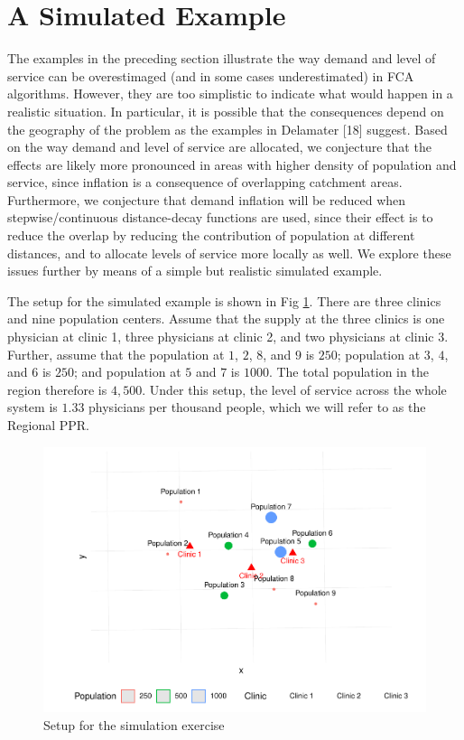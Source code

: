 \documentclass[10pt,letterpaper]{article}
\begin{document}
\section{A Simulated Example}\label{a-simulated-example}

The examples in the preceding section illustrate the way demand and
level of service can be overestimaged (and in some cases underestimated)
in FCA algorithms. However, they are too simplistic to indicate what
would happen in a realistic situation. In particular, it is possible
that the consequences depend on the geography of the problem as the
examples in Delamater {[}18{]} suggest. Based on the way demand and
level of service are allocated, we conjecture that the effects are
likely more pronounced in areas with higher density of population and
service, since inflation is a consequence of overlapping catchment
areas. Furthermore, we conjecture that demand inflation will be reduced
when stepwise/continuous distance-decay functions are used, since their
effect is to reduce the overlap by reducing the contribution of
population at different distances, and to allocate levels of service
more locally as well. We explore these issues further by means of a
simple but realistic simulated example.

The setup for the simulated example is shown in Fig
\ref{fig:fig6-simulation}. There are three clinics and nine population
centers. Assume that the supply at the three clinics is one physician at
clinic 1, three physicians at clinic 2, and two physicians at clinic 3.
Further, assume that the population at \(1\), \(2\), \(8\), and \(9\) is
\(250\); population at \(3\), \(4\), and \(6\) is \(250\); and
population at \(5\) and \(7\) is \(1000\). The total population in the
region therefore is \(4,500\). Under this setup, the level of service
across the whole system is \(1.33\) physicians per thousand people,
which we will refer to as the Regional PPR.

\begin{figure}
\includegraphics[width=0.95\linewidth]{Supply_and_Demand_Inflation_in_FCA_Methods_v2.1_files/figure-latex/fig6-simulation-1} \caption{\label{fig:fig6-simulation}Setup for the simulation exercise}\label{fig:fig6-simulation}
\end{figure}
\end{document}
